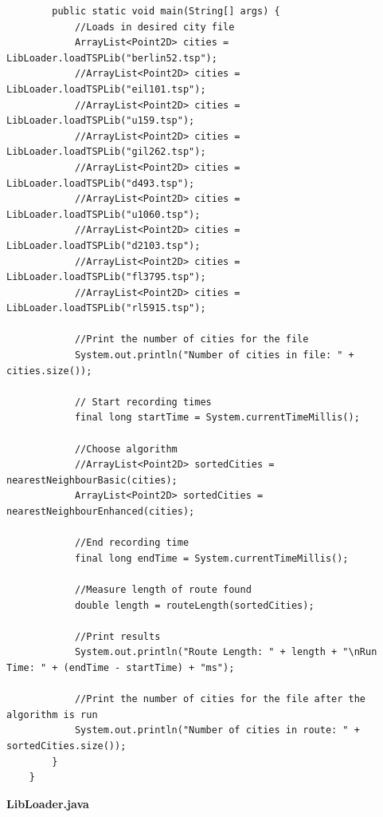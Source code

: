 \documentclass[conference,backref=page]{acmsiggraph}
\begin{document}
\begin{lstlisting}
		public static void main(String[] args) {
			//Loads in desired city file
			ArrayList<Point2D> cities = LibLoader.loadTSPLib("berlin52.tsp");
			//ArrayList<Point2D> cities = LibLoader.loadTSPLib("eil101.tsp");
			//ArrayList<Point2D> cities = LibLoader.loadTSPLib("u159.tsp");
			//ArrayList<Point2D> cities = LibLoader.loadTSPLib("gil262.tsp");
			//ArrayList<Point2D> cities = LibLoader.loadTSPLib("d493.tsp");
			//ArrayList<Point2D> cities = LibLoader.loadTSPLib("u1060.tsp");
			//ArrayList<Point2D> cities = LibLoader.loadTSPLib("d2103.tsp");
			//ArrayList<Point2D> cities = LibLoader.loadTSPLib("fl3795.tsp");
			//ArrayList<Point2D> cities = LibLoader.loadTSPLib("rl5915.tsp");
			
			//Print the number of cities for the file
			System.out.println("Number of cities in file: " + cities.size());
			
			// Start recording times
			final long startTime = System.currentTimeMillis();
			
			//Choose algorithm
			//ArrayList<Point2D> sortedCities = nearestNeighbourBasic(cities);
			ArrayList<Point2D> sortedCities = nearestNeighbourEnhanced(cities);
			
			//End recording time
			final long endTime = System.currentTimeMillis();			
			
			//Measure length of route found
			double length = routeLength(sortedCities);
			
			//Print results
			System.out.println("Route Length: " + length + "\nRun Time: " + (endTime - startTime) + "ms");
			
			//Print the number of cities for the file after the algorithm is run
			System.out.println("Number of cities in route: " + sortedCities.size());
		}
	}
\end{lstlisting}

\clearpage
\textbf{LibLoader.java}
\end{document}
